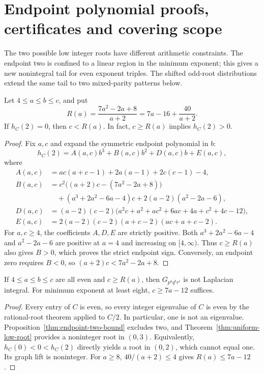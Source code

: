 \section{Endpoint polynomial proofs, certificates and covering scope}
\label{sec:endpoint-details}

The two possible low integer roots have different arithmetic constraints.
The endpoint two is confined to a linear region in the minimum exponent;
this gives a new nonintegral tail for even exponent triples.
The shifted odd-root distributions extend the same tail to two mixed-parity
patterns below.

\begin{proposition}
\label{thm:endpoint-two-bound}
Let $4\leq a\leq b\leq c$, and put
\[
R(a)=\frac{7a^2-2a+8}{a+2}=7a-16+\frac{40}{a+2}.
\]
If $h_C(2)=0$, then $c<R(a)$. In fact, $c\geq R(a)$ implies
$h_C(2)>0$.
\end{proposition}

\begin{proof}
Fix $a,c$ and expand the symmetric endpoint polynomial in $b$:
\[
h_C(2)=A(a,c)b^3+B(a,c)b^2+D(a,c)b+E(a,c),
\]
where
\begin{align*}
A(a,c)&=ac(a+c-1)+2a(a-1)+2c(c-1)-4,\\
B(a,c)&=c^2\bigl((a+2)c-(7a^2-2a+8)\bigr)\\
&\quad +(a^3+2a^2-6a-4)c+2(a-2)(a^2-2a-6),\\
D(a,c)&=(a-2)(c-2)\bigl(a^2c+a^2+ac^2+6ac+4a+c^2+4c-12\bigr),\\
E(a,c)&=2(a-2)(c-2)(a+c-2)(ac+a+c-2).
\end{align*}
For $a,c\geq4$, the coefficients $A,D,E$ are strictly positive.
Both $a^3+2a^2-6a-4$ and $a^2-2a-6$ are positive at $a=4$
and increasing on $[4,\infty)$. Thus $c\geq R(a)$ also gives $B>0$,
which proves the strict endpoint sign. Conversely, an endpoint zero
requires $B<0$, so $(a+2)c<7a^2-2a+8$.
\end{proof}

\begin{proposition}
\label{cor:even-linear-tail}
If $4\leq a\leq b\leq c$ are all even and $c\geq R(a)$,
then $G_{p^a q^b r^c}$ is not Laplacian integral.
For minimum exponent at least eight, $c\geq7a-12$ suffices.
\end{proposition}

\begin{proof}
Every entry of $C$ is even, so every integer eigenvalue of $C$ is even
by the rational-root theorem applied to $C/2$. In particular, one is
not an eigenvalue. Proposition~\ref{thm:endpoint-two-bound} excludes two,
and Theorem~\ref{thm:uniform-low-root} provides a noninteger root in
$(0,3)$. Equivalently, $h_C(0)<0<h_C(2)$ directly yields a root in
$(0,2)$, which cannot equal one. Its graph lift is noninteger.
For $a\geq8$, $40/(a+2)\leq4$ gives $R(a)\leq7a-12$.
\end{proof}

